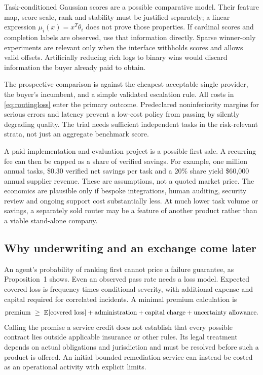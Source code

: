 \documentclass[11pt]{article}
\newcommand{\E}{\mathbb E}
\theoremstyle{remark}\newtheorem{example}{Example}
\begin{document}
Task-conditioned Gaussian scores are a possible comparative model. Their
feature map, score scale, rank and stability must be justified separately; a
linear expression $\mu_i(x)=x^T\theta_i$ does not prove those properties.
If cardinal scores and completion labels are observed, use that information
directly. Sparse winner-only experiments are relevant only when the interface
withholds scores and allows valid offsets. Artificially reducing rich logs to
binary wins would discard information the buyer already paid to obtain.

The prospective comparison is against the cheapest acceptable single provider,
the buyer's incumbent, and a simple validated escalation rule. All costs in
\eqref{eq:routingloss} enter the primary outcome. Predeclared noninferiority
margins for serious errors and latency prevent a low-cost policy from passing
by silently degrading quality. The trial needs sufficient independent tasks
in the risk-relevant strata, not just an aggregate benchmark score.

A paid implementation and evaluation project is a possible first sale. A
recurring fee can then be capped as a share of verified savings. For example,
one million annual tasks, \$0.30 verified net savings per task and a 20\%
share yield \$60,000 annual supplier revenue. These are assumptions, not a
quoted market price. The economics are plausible only if bespoke integrations,
human auditing, security review and ongoing support cost substantially less.
At much lower task volume or savings, a separately sold router may be a feature
of another product rather than a viable stand-alone company.

\subsection{Why underwriting and an exchange come later}
An agent's probability of ranking first cannot price a failure guarantee, as
Proposition~1 shows. Even an observed pass rate needs a loss model. Expected
covered loss is frequency times conditional severity, with additional expense
and capital required for correlated incidents. A minimal premium calculation is
\begin{equation}
 \hbox{premium}\ \geq\ \E[\hbox{covered loss}]
   +\hbox{administration}+\hbox{capital charge}+\hbox{uncertainty allowance}.
\end{equation}
Calling the promise a service credit does not establish that every possible
contract lies outside applicable insurance or other rules. Its legal treatment
depends on actual obligations and jurisdiction and must be resolved before
such a product is offered. An initial bounded remediation service can instead
be costed as an operational activity with explicit limits.
\end{document}
